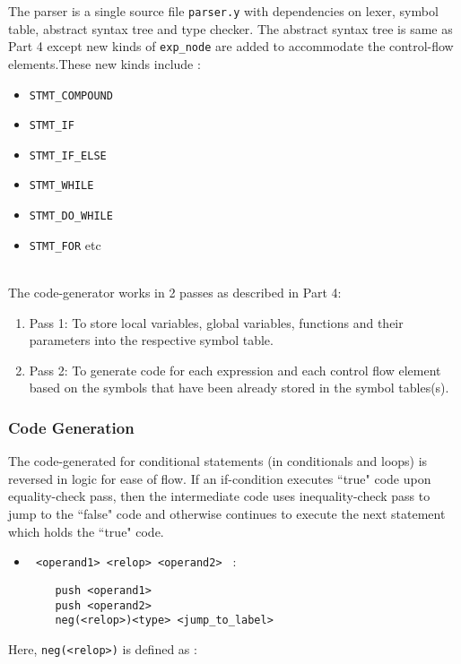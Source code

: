 \documentclass[12pt]{article}
\begin{document}
The parser is a single source file \texttt{parser.y} with dependencies on lexer, symbol table, abstract syntax tree and type checker. The abstract syntax tree is same as Part 4 except new kinds of \texttt{exp\_node} are added to accommodate the control-flow elements.These new kinds include :
\begin{itemize}
\item \texttt{STMT\_COMPOUND}
\item \texttt{STMT\_IF}
\item \texttt{STMT\_IF\_ELSE}
\item \texttt{STMT\_WHILE}
\item \texttt{STMT\_DO\_WHILE}
\item \texttt{STMT\_FOR} etc
\end{itemize}
~
\\The code-generator works in 2 passes as described in Part 4:
\begin{enumerate}
\item Pass 1: To store local variables, global variables, functions and their parameters into the respective symbol table.
\item Pass 2: To generate code for each expression and each control flow element based on the symbols that have been already stored in the symbol tables(s). 
\end{enumerate}


\subsubsection{Code Generation}

The code-generated for conditional statements (in conditionals and loops) is reversed in logic for ease of flow. If an if-condition executes ``true" code upon equality-check pass, then the intermediate code uses inequality-check pass to jump to the ``false" code and otherwise continues to execute the next statement which holds the ``true" code. 

\begin{itemize}
\item \texttt{ <operand1> <relop> <operand2> } :
\begin{verbatim}
	push <operand1>
	push <operand2>
	neg(<relop>)<type> <jump_to_label> 
\end{verbatim}
\end{itemize}

Here, \texttt{neg(<relop>)} is defined as :
\end{document}
